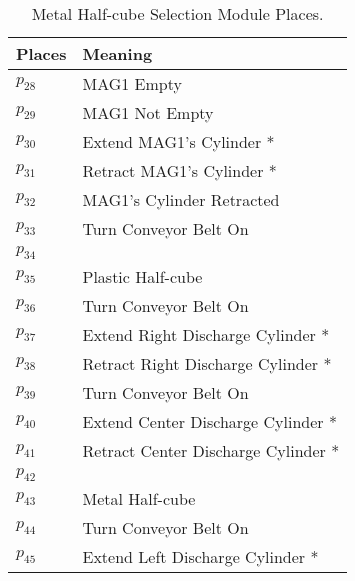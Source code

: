 \begin{table}[H]
\caption{Metal Half-cube Selection Module Places.}
\centering
\begin{tabular}{M{5cm}M{10cm}}
Places & Meaning\\
\hline
\hyperlink{partialNet:p28}{\hypertarget{partialTable:p28}{$p_{28}$}} & MAG1 Empty\\
\hyperlink{partialNet:p29}{\hypertarget{partialTable:p29}{$p_{29}$}} & MAG1 Not Empty\\
\hyperlink{partialNet:p30}{\hypertarget{partialTable:p30}{$p_{30}$}} & Extend MAG1's Cylinder *\\
\hyperlink{partialNet:p31}{\hypertarget{partialTable:p31}{$p_{31}$}} & Retract MAG1's Cylinder *\\
\hyperlink{partialNet:p32}{\hypertarget{partialTable:p32}{$p_{32}$}} & MAG1's Cylinder Retracted\\
\hyperlink{partialNet:p33}{\hypertarget{partialTable:p33}{$p_{33}$}} & Turn Conveyor Belt On\\
\hyperlink{partialNet:p34}{\hypertarget{partialTable:p34}{$p_{34}$}} & \\
\hyperlink{partialNet:p35}{\hypertarget{partialTable:p35}{$p_{35}$}} & Plastic Half-cube\\
\hyperlink{partialNet:p36}{\hypertarget{partialTable:p36}{$p_{36}$}} & Turn Conveyor Belt On\\
\hyperlink{partialNet:p37}{\hypertarget{partialTable:p37}{$p_{37}$}} & Extend Right Discharge Cylinder *\\
\hyperlink{partialNet:p38}{\hypertarget{partialTable:p38}{$p_{38}$}} & Retract Right Discharge Cylinder *\\
\hyperlink{partialNet:p39}{\hypertarget{partialTable:p39}{$p_{39}$}} & Turn Conveyor Belt On\\
\hyperlink{partialNet:p40}{\hypertarget{partialTable:p40}{$p_{40}$}} & Extend Center Discharge Cylinder *\\
\hyperlink{partialNet:p41}{\hypertarget{partialTable:p41}{$p_{41}$}} & Retract Center Discharge Cylinder *\\
\hyperlink{partialNet:p42}{\hypertarget{partialTable:p42}{$p_{42}$}} & \\
\hyperlink{partialNet:p43}{\hypertarget{partialTable:p43}{$p_{43}$}} & Metal Half-cube\\
\hyperlink{partialNet:p44}{\hypertarget{partialTable:p44}{$p_{44}$}} & Turn Conveyor Belt On\\
\hyperlink{partialNet:p45}{\hypertarget{partialTable:p45}{$p_{45}$}} & Extend Left Discharge Cylinder *\\

\end{tabular}
\end{table}
